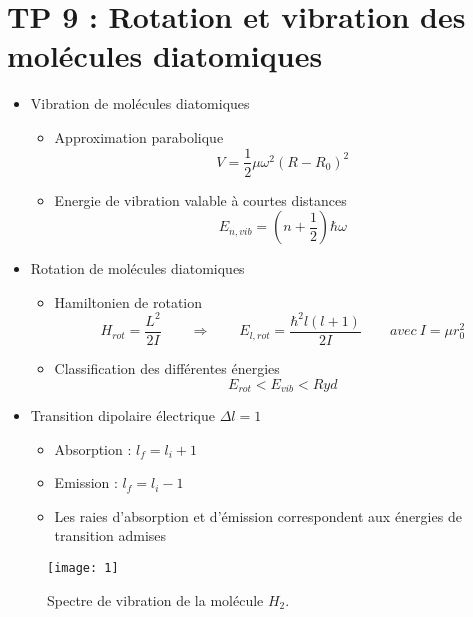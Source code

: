 
\section*{TP 9 : Rotation et vibration des molécules diatomiques}
\begin{itemize}
		
	\item Vibration de molécules diatomiques
	      \begin{itemize}
	      				
	      	\item Approximation parabolique 
	      	      \begin{equation}
	      	      	V = \frac{1}{2}\mu \omega ^2 (R-R_0)^2
	      	      \end{equation}
	      	      					
	      	\item Energie de vibration valable à courtes distances 
	      	      \begin{equation}
	      	      	E_{n,vib} = (n+\frac{1}{2})\hbar \omega
	      	      \end{equation}
	      \end{itemize}
	      		
	\item Rotation de molécules diatomiques
	      			
	      \begin{itemize}
	      	\item Hamiltonien de rotation
	      	      \begin{equation}
	      	      	H_{rot} = \frac{L^2}{2I} \qquad \Rightarrow \qquad E_{l,rot} = \frac{\hbar ^2 l(l+1)}{2I} \qquad avec \ I = \mu r_0 ^2
	      	      \end{equation}
	      	      				
	      	\item Classification des différentes énergies
	      	      \begin{equation}
	      	      	E_{rot} < E_{vib} < Ryd
	      	      \end{equation}
	      \end{itemize}
	      			
	\item Transition dipolaire électrique $\Delta l = 1$
	      
	      \begin{itemize}
	      	\item Absorption : $l_f = l_i + 1$
	      	\item Emission : $l_f = l_i - 1$
	      	\item Les raies d'absorption et d'émission correspondent aux énergies de transition admises
	      \end{itemize}
\end{itemize}

\begin{figure}[h]
	\begin{center}
		\texttt{[image: 1]}
		\caption{Spectre de vibration de la molécule $H_2$.}
	\end{center}
\end{figure}